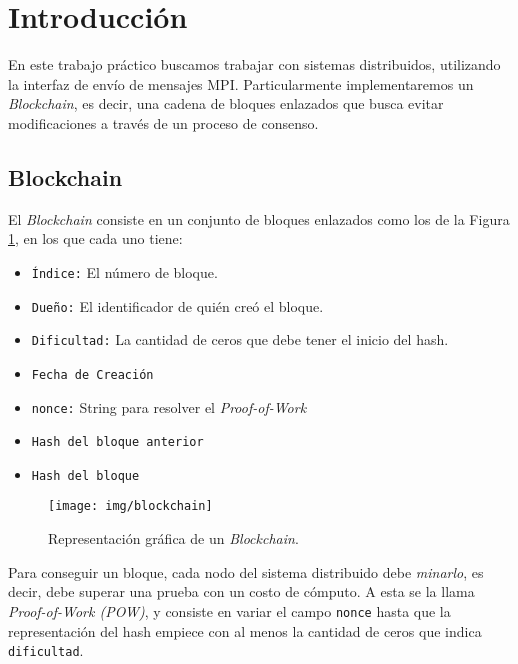 \section{Introducción}





En este trabajo práctico buscamos trabajar con sistemas distribuidos, utilizando la interfaz de envío de mensajes MPI. Particularmente implementaremos un \textit{Blockchain}, es decir, una cadena de bloques enlazados que busca evitar modificaciones a través de un proceso de consenso.

\subsection{Blockchain}
El \textit{Blockchain} consiste en un conjunto de bloques enlazados como los de la Figura \ref{fig:blockchain}, en los que cada uno tiene:
\begin{itemize}
	\item \texttt{\'Indice:} El número de bloque.
	\item \texttt{Dueño:} El identificador de quién creó el bloque.
	\item \texttt{Dificultad:} La cantidad de ceros que debe tener el inicio del hash.
	\item \texttt{Fecha de Creación}
	\item \texttt{nonce:} String para resolver el \textit{Proof-of-Work}
	\item \texttt{Hash del bloque anterior}
	\item \texttt{Hash del bloque}
\end{itemize}

\begin{figure}[H]
	\centering
	\texttt{[image: img/blockchain]}
	\caption{Representación gráfica de un \textit{Blockchain}.}
	\label{fig:blockchain}
\end{figure}


Para conseguir un bloque, cada nodo del sistema distribuido debe \textit{minarlo}, es decir, debe superar una prueba con un costo de cómputo. A esta se la llama \textit{Proof-of-Work (POW)}, y consiste en variar el campo \texttt{nonce} hasta que la representación del hash empiece con al menos la cantidad de ceros que indica \texttt{dificultad}. 

